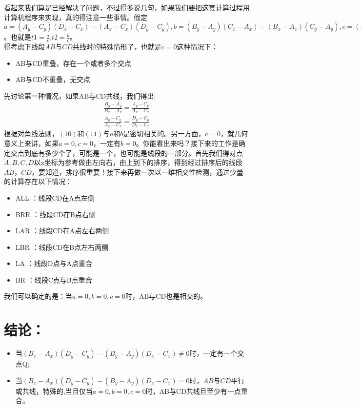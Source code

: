 \documentclass[UTF8,12pt]{article}
\begin{document}
	看起来我们算是已经解决了问题，不过得多说几句，如果我们要把这套计算过程用计算机程序来实现，真的得注意一些事情。假定$a=(A_y-C_y)(D_x-C_x) - (A_x-C_x)(D_y-C_y), b=(B_y-A_y)(C_x-A_x) - (B_x-A_x)(C_y-A_y) , c=(B_x-A_x)(D_y-C_y)-(B_y-A_y)(D_x-C_x)$。也就是$t1=\frac{a}{c}$,$t2=\frac{b}{c}$。\\
	得考虑下线段$AB$与$CD$共线时的特殊情形了，也就是$c=0$这种情况下：
	\begin{itemize}
		\item AB与CD重叠，存在一个或者多个交点
		\item AB与CD不重叠，无交点
	\end{itemize}
	先讨论第一种情况，如果AB与CD共线，我们得出:
	\begin{eqnarray}
		\frac{B_y-A_y}{B_x-A_x} = \frac{A_y-C_y}{A_x-C_x}\\
		\frac{A_y-C_y}{A_x-C_x} = \frac{D_y-C_y}{D_x-C_x}
	\end{eqnarray}
	根据对角线法则，$(10)$和$(11)$与$a$和$b$是密切相关的。另一方面，$c=0$，就几何意义上来讲，如果$a=0,c=0$，一定有$b=0$。你能看出来吗？接下来的工作是确定交点到底有多少个了，可能是一个，也可能是线段的一部分。首先我们得对点$A,B,C,D$以x坐标为参考做由左向右，由上到下的排序，得到经过排序后的线段$AB$，$CD$，要知道，排序很重要！接下来再做一次以一维相交性检测，通过少量的计算存在以下情况：
	\begin{itemize}
		\item ALL ：线段CD在A点左侧
		\item BRR ：线段CD在B点右侧
		\item LAR ：线段CD在A点左右两侧
		\item LBR ：线段CD在B点左右两侧
		\item LA ：线段D点与A点重合
		\item BR ：线段C点与B点重合
	\end{itemize}
	我们可以确定的是：当$a=0,b=0,c=0$时，AB与CD也是相交的。
	\section{结论：}
	\begin{itemize}
		\item 当$(B_x-A_x)(D_y-C_y)-(B_y-A_y)(D_x-C_x)\neq0$时，一定有一个交点Q;
		\item 当$(B_x-A_x)(D_y-C_y)-(B_y-A_y)(D_x-C_x)=0$时，$AB$与$CD$平行或共线，特殊的,当且仅当$a=0,b=0,c=0$时，AB与CD共线且至少有一点重合。
	\end{itemize}
\end{document}
